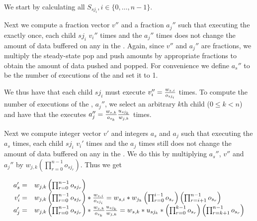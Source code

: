 We start by calculating all $S_{sj_i}, i \in \{0, \dots, n-1\}$.

Next we compute a fraction vector $v''$ and a fraction $a_j''$
such that executing the {\splitter} exactly once, each child
$sj_i$ $v_i''$ times and the {\joiner} $a_j''$ times does not
change the amount of data buffered on any \Channel in the
{\splitjoin}. Again, since $v''$ and $a_j''$ are fractions, we
multiply the steady-state pop and push amounts by appropriate
fractions to obtain the amount of data pushed and popped.  For
convenience we define $a_s''$ to be the number of executions of
the {\splitter} and set it to 1.

\begin{comment}
\begin{displaymath}
v'', a_j'', a_s'' \ne 0, \forall i \in \{0,\dots,n-1\}, a_s'' *
w_{s, i} = v_i'' * o_{sj_i}, v_i'' * u_{sj_i} = a_j'' * w_{j, i}
\end{displaymath}
\end{comment}

We thus have that each child $sj_i$ must execute $v_i'' = {w_{s,i}
\over o_{sj_i}}$ times. To compute the number of executions of the
{\joiner}, $a_j''$, we select an arbitrary $k$th child ($0 \le k <
n$) and have that the {\joiner} executes $a_j'' = {{w_{s,k} \over
o_{s_k}}{u_{sj_k} \over w_{j,k}}}$ times.

Next we compute integer vector $v'$ and integers $a_s$ and $a_j$
such that executing the {\splitter} $a_s$ times, each child $sj_i$
$v_i'$ times and the {\joiner} $a_j$ times still does not change
the amount of data buffered on any \Channel in the {\splitjoin}.
We do this by multiplying $a_s''$, $v''$ and $a_j''$ by $w_{j,k}
\left(\prod_{r=0}^{n-1}o_{sj_r}\right)$. Thus we get

\begin{displaymath}
\begin{array}{rl}
a_s' = & w_{j,k} \left(\prod_{r=0}^{n-1}o_{sj_r}\right) \\
v_i' = & w_{j,k} \left(\prod_{r=0}^{n-1}o_{sj_r}\right) * {w_{s,i}
\over o_{sj_i}} = w_{s,i} * w_{j_k} \left( \prod_{r=0}^{i-1}
o_{s_r} \right) \left( \prod_{r=i+1}^{n-1} o_{s_r} \right)
\\
a_j' = & w_{j,k} \left(\prod_{r=0}^{n-1}o_{sj_r}\right) *
{{w_{s,k} \over o_{s_k}}{u_{sj_k} \over w_{j,k}}} = w_{s,k} *
u_{sj_k} * \left( \prod_{r=0}^{k-1} o_{s_r} \right)
\left( \prod_{r=k+1}^{n-1} o_{s_r} \right) \\
\end{array}
\end{displaymath}

